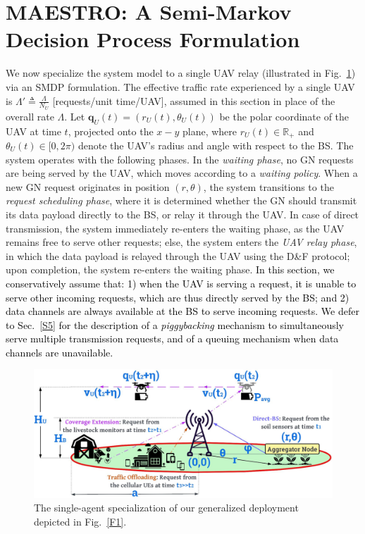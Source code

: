 \documentclass[10pt, twocolumn]{IEEEtran}
\theoremstyle{plain}
\theoremstyle{definition}
\theoremstyle{remark}
\newcommand\hlt[1]{\textcolor{black}{#1}}
\begin{document}
\section{MAESTRO: A Semi-Markov Decision Process Formulation}\label{S3}
We now specialize the system model to a single UAV relay (illustrated in Fig.~\ref{F4}) via an SMDP formulation. The effective traffic rate experienced by a single UAV is $\Lambda'{\triangleq}\frac{\Lambda}{N_{U}}$ [requests/unit time/UAV], assumed in this section in place of the overall rate $\Lambda$. Let $\mathbf{q}_{U}(t){=}(r_{U}(t),\theta_{U}(t))$ be the polar coordinate of the UAV at time $t$, projected onto the $x{-}y$ plane, where $r_{U}(t){\in}\mathbb{R}_{+}$ and $\theta_{U}(t){\in}[0,2\pi)$ denote the UAV's radius and angle with respect to the BS. The system operates with the following phases. In the \emph{waiting phase}, no GN requests are being served by the UAV, which moves according to a \emph{waiting policy}. When a new GN request originates in position $(r,\theta)$, the system transitions to the \emph{request scheduling phase}, where it is determined whether the GN should transmit its data payload directly to the BS, or relay it through the UAV. In case of direct transmission, the system immediately re-enters the waiting phase, as the UAV remains free to serve other requests; else, the system enters the \emph{UAV relay phase}, in which the data payload is relayed through the UAV using the D\&F protocol; upon  completion, the system re-enters the waiting phase. \hlt{In this section, we conservatively assume that: 1) when the UAV is serving a request, it is unable to serve other incoming requests, which are thus directly served by the BS; and 2) data channels are always available at the BS to serve incoming requests. We defer to Sec.~\ref{S5} for the description of a \emph{piggybacking} mechanism to simultaneously serve multiple transmission requests, and of a queuing mechanism when data channels are unavailable.}
\begin{figure} [t]
    \centering
    \includegraphics[width=0.6\linewidth]{figs/Deployment_Model.jpg}
    \vspace{-2mm}
    \caption{The single-agent specialization of our generalized deployment depicted in Fig.~\ref{F1}.}
    \vspace{-6mm}
    \label{F4}
\end{figure}
\end{document}
